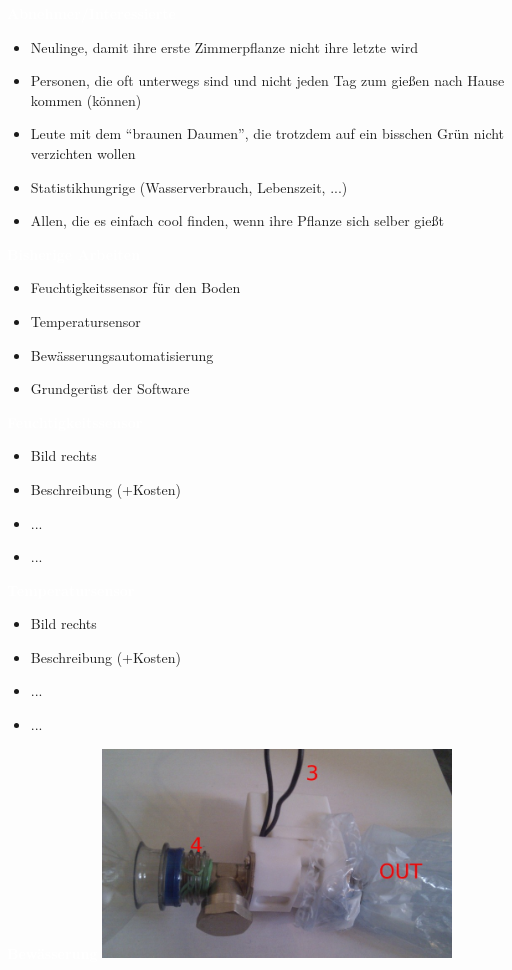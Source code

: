 \documentclass[bigger]{beamer}
\newcommand{\topic}[1]{{\huge{\textcolor{white}{\textbf{#1}}}}}
\begin{document}
\begin{frame}{\topic{Abnehmer/Interessierte}}
	\begin{itemize}
		\item Neulinge, damit ihre erste Zimmerpflanze nicht ihre letzte wird
		\item Personen, die oft unterwegs sind und nicht jeden Tag zum gießen nach Hause kommen (können)
		\item Leute mit dem “braunen Daumen”, die trotzdem auf ein bisschen Grün nicht verzichten wollen
		\item Statistikhungrige (Wasserverbrauch, Lebenszeit, ...)
		\item Allen, die es einfach cool finden, wenn ihre Pflanze sich selber gießt
	\end{itemize}
\end{frame}

\begin{frame}{\topic{Bisherige Arbeiten}}
	\begin{itemize}
		\item Feuchtigkeitssensor für den Boden
		\item Temperatursensor
		\item Bewässerungsautomatisierung
		\item Grundgerüst der Software
	\end{itemize}
\end{frame}

\begin{frame}{\topic{Feuchtigkeitssensor}}
	\begin{itemize}
		\item Bild rechts
		\item Beschreibung (+Kosten)
		\item ...
		\item ...
	\end{itemize}
\end{frame}

\begin{frame}{\topic{Temperatursensor}}
	\begin{itemize}
		\item Bild rechts
		\item Beschreibung (+Kosten)
		\item ...
		\item ...
	\end{itemize}
\end{frame}

\begin{frame}{\topic{Bewässerung}}
       \includegraphics[width=350px]{Anschluss.jpg}
\end{frame}
\end{document}
